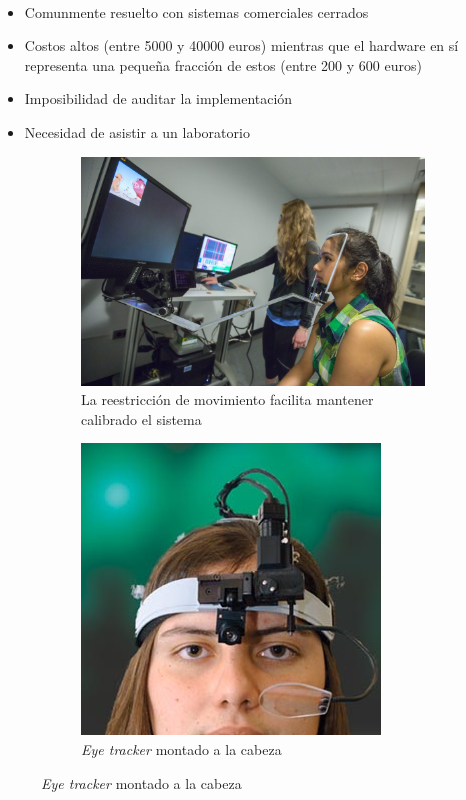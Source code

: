 \documentclass[aspectratio=169]{beamer}
\begin{document}
\begin{frame}{~}

  \begin{itemize}
    \item Comunmente resuelto con sistemas comerciales cerrados
    \item Costos altos (entre 5000 y 40000 euros) mientras que el hardware en
      sí representa una pequeña fracción de estos (entre 200 y 600 euros)

    \item Imposibilidad de auditar la implementación
    \item Necesidad de asistir a un laboratorio
  \end{itemize}

  \begin{figure}
    \begin{subfigure}{0.49\textwidth}
      \centering
      \includegraphics[width=0.6\linewidth]{img/eye-link-chinrest.jpg}
      \caption{La reestricción de movimiento facilita mantener calibrado el
      sistema}
    \end{subfigure}
    \begin{subfigure}{0.49\textwidth}
      \centering
      \includegraphics[width=0.5\linewidth]{img/eye-tracker-head-mounted.jpg}
      \caption{\textit{Eye tracker} montado a la cabeza}
    \end{subfigure}
  \end{figure}

\end{frame}
\end{document}
